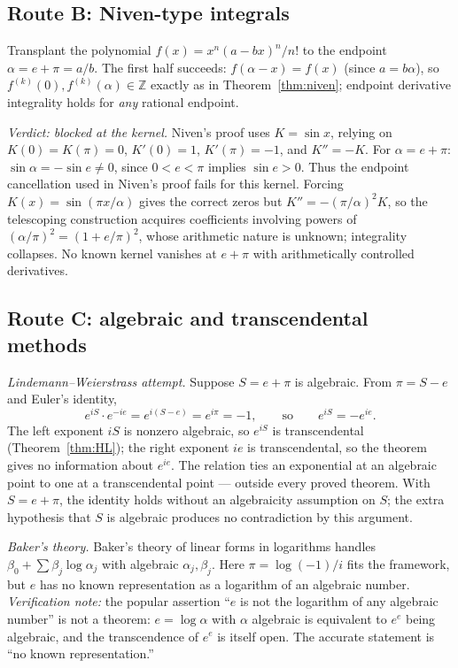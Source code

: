 \documentclass[11pt]{amsart}
\theoremstyle{definition}
\theoremstyle{remark}
\numberwithin{equation}{section}
\newcommand{\Z}{\mathbb{Z}}
\newcommand{\ee}{e}
\begin{document}
\subsection{Route B: Niven-type integrals}

Transplant the polynomial $f(x)=x^n(a-bx)^n/n!$ to the endpoint $\alpha=e+\pi=a/b$. The first half succeeds: $f(\alpha-x)=f(x)$ (since $a=b\alpha$), so $f^{(k)}(0),f^{(k)}(\alpha)\in\Z$ exactly as in Theorem~\ref{thm:niven}; endpoint derivative integrality holds for \emph{any} rational endpoint.

\emph{Verdict: blocked at the kernel.} Niven's proof uses $K=\sin x$, relying on $K(0)=K(\pi)=0$, $K'(0)=1$, $K'(\pi)=-1$, and $K''=-K$. For $\alpha=e+\pi$: $\sin\alpha=-\sin e\ne0$, since $0<e<\pi$ implies $\sin e>0$. Thus the endpoint cancellation used in Niven's proof fails for this kernel. Forcing $K(x)=\sin(\pi x/\alpha)$ gives the correct zeros but $K''=-(\pi/\alpha)^2K$, so the telescoping construction acquires coefficients involving powers of $(\alpha/\pi)^2=(1+e/\pi)^2$, whose arithmetic nature is unknown; integrality collapses. No known kernel vanishes at $e+\pi$ with arithmetically controlled derivatives.

\subsection{Route C: algebraic and transcendental methods}

\emph{Lindemann--Weierstrass attempt.} Suppose $S=e+\pi$ is algebraic. From $\pi=S-e$ and Euler's identity,
\[
\ee^{iS}\cdot\ee^{-ie}=\ee^{i(S-e)}=\ee^{i\pi}=-1,\qquad\text{so}\qquad \ee^{iS}=-\ee^{ie}.
\]
The left exponent $iS$ is nonzero algebraic, so $\ee^{iS}$ is transcendental (Theorem~\ref{thm:HL}); the right exponent $ie$ is transcendental, so the theorem gives no information about $\ee^{ie}$. The relation ties an exponential at an algebraic point to one at a transcendental point --- outside every proved theorem. With $S=e+\pi$, the identity holds without an algebraicity assumption on $S$; the extra hypothesis that $S$ is algebraic produces no contradiction by this argument.

\emph{Baker's theory.} Baker's theory of linear forms in logarithms \cite{Baker} handles $\beta_0+\sum\beta_j\log\alpha_j$ with algebraic $\alpha_j,\beta_j$. Here $\pi=\log(-1)/i$ fits the framework, but $\ee$ has no known representation as a logarithm of an algebraic number. \emph{Verification note:} the popular assertion ``$\ee$ is not the logarithm of any algebraic number'' is not a theorem: $\ee=\log\alpha$ with $\alpha$ algebraic is equivalent to $\ee^\ee$ being algebraic, and the transcendence of $\ee^\ee$ is itself open. The accurate statement is ``no known representation.''
\end{document}
